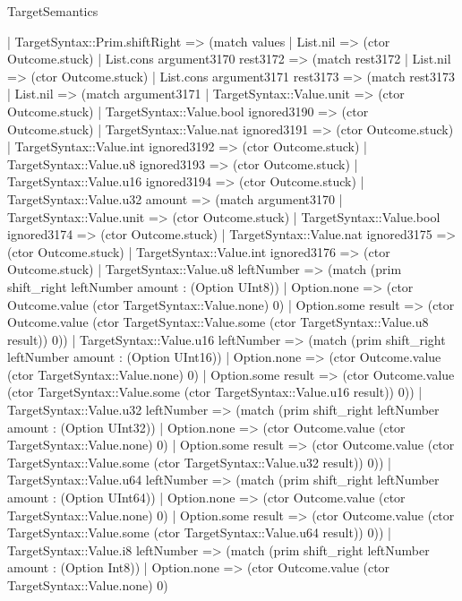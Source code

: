 \begin{lexlean}{TargetSemantics}
\begin{semanticmodule}
{    | TargetSyntax::Prim.shiftRight => (match values
      | List.nil => (ctor Outcome.stuck)
      | List.cons argument3170 rest3172 => (match rest3172
        | List.nil => (ctor Outcome.stuck)
        | List.cons argument3171 rest3173 => (match rest3173
          | List.nil => (match argument3171
            | TargetSyntax::Value.unit => (ctor Outcome.stuck)
            | TargetSyntax::Value.bool ignored3190 => (ctor Outcome.stuck)
            | TargetSyntax::Value.nat ignored3191 => (ctor Outcome.stuck)
            | TargetSyntax::Value.int ignored3192 => (ctor Outcome.stuck)
            | TargetSyntax::Value.u8 ignored3193 => (ctor Outcome.stuck)
            | TargetSyntax::Value.u16 ignored3194 => (ctor Outcome.stuck)
            | TargetSyntax::Value.u32 amount => (match argument3170
              | TargetSyntax::Value.unit => (ctor Outcome.stuck)
              | TargetSyntax::Value.bool ignored3174 => (ctor Outcome.stuck)
              | TargetSyntax::Value.nat ignored3175 => (ctor Outcome.stuck)
              | TargetSyntax::Value.int ignored3176 => (ctor Outcome.stuck)
              | TargetSyntax::Value.u8 leftNumber => (match (prim shift_right leftNumber amount : (Option UInt8))
                | Option.none => (ctor Outcome.value (ctor TargetSyntax::Value.none) 0)
                | Option.some result => (ctor Outcome.value (ctor TargetSyntax::Value.some (ctor TargetSyntax::Value.u8 result)) 0))
              | TargetSyntax::Value.u16 leftNumber => (match (prim shift_right leftNumber amount : (Option UInt16))
                | Option.none => (ctor Outcome.value (ctor TargetSyntax::Value.none) 0)
                | Option.some result => (ctor Outcome.value (ctor TargetSyntax::Value.some (ctor TargetSyntax::Value.u16 result)) 0))
              | TargetSyntax::Value.u32 leftNumber => (match (prim shift_right leftNumber amount : (Option UInt32))
                | Option.none => (ctor Outcome.value (ctor TargetSyntax::Value.none) 0)
                | Option.some result => (ctor Outcome.value (ctor TargetSyntax::Value.some (ctor TargetSyntax::Value.u32 result)) 0))
              | TargetSyntax::Value.u64 leftNumber => (match (prim shift_right leftNumber amount : (Option UInt64))
                | Option.none => (ctor Outcome.value (ctor TargetSyntax::Value.none) 0)
                | Option.some result => (ctor Outcome.value (ctor TargetSyntax::Value.some (ctor TargetSyntax::Value.u64 result)) 0))
              | TargetSyntax::Value.i8 leftNumber => (match (prim shift_right leftNumber amount : (Option Int8))
                | Option.none => (ctor Outcome.value (ctor TargetSyntax::Value.none) 0)
}
\end{semanticmodule}
\end{lexlean}
